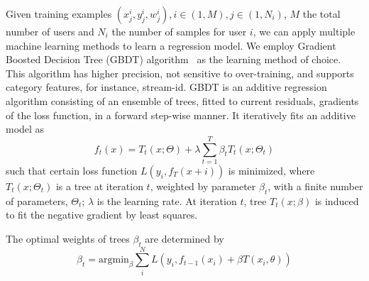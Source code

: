 Given training examples $(x_{j}^{i},y_{j}^{i},w_{j}^{i}), i \in (1,M), j \in 
(1,N_{i})$, $M$ the total number of users and $N_{i}$ the number of samples 
for user $i$, we can apply multiple machine learning methods to learn a 
regression model. 
We employ Gradient Boosted Decision Tree (GBDT) 
algorithm~\cite{Friedman:2002,Ye:2009} as the learning method of choice. This 
algorithm has higher precision, not sensitive to over-training, and supports 
category features, for instance, stream-id. GBDT is an
additive regression algorithm consisting of an ensemble of trees,
fitted to current residuals, gradients of the loss function, in a
forward step-wise manner. It iteratively fits an additive model as
$$
f_t(x) = T_t(x; \Theta) + \lambda \sum_{t=1}^T \beta_t T_t(x; \Theta_t)
$$
\noindent such that certain loss function $L(y_i, f_T (x + i))$ is
minimized, where $T_t(x;\Theta_t)$ is a tree at iteration $t$,
weighted by parameter $\beta_t$, with a finite number of parameters,
$\Theta_t$; $\lambda$ is the learning rate. At iteration $t$, tree
$T_t(x; \beta)$ is induced to fit the negative gradient by least
squares.


\noindent The optimal weights of trees $\beta_t$ are determined by
$$
\beta_t = \text{argmin} _{\beta} \sum_i^N L(y_i, f_{t-1}(x_i) + \beta T(x_i, \theta))
$$




